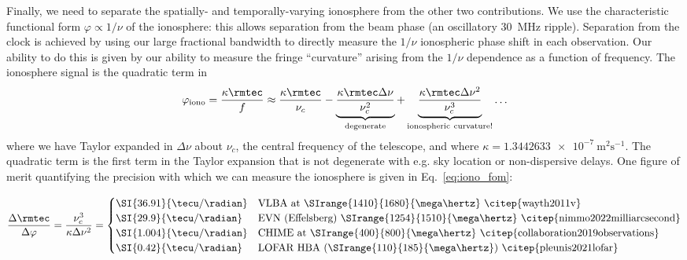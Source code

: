 Finally, we need to separate the spatially- and temporally-varying ionosphere from the other two contributions. We use the characteristic functional form $\varphi \propto 1/\nu$ of the ionosphere: this allows separation from the beam phase (an oscillatory \SI{30}{\mega\hertz} ripple). Separation from the clock is achieved by using our large fractional bandwidth to directly measure the $1/\nu$ ionospheric phase shift in each observation. Our ability to do this is given by our ability to measure the fringe ``curvature'' arising from the $1/\nu$ dependence as a function of frequency. The ionosphere signal is the quadratic term in
\begin{equation} 
    \varphi_\mathrm{iono} = \dfrac{\kappa \rmtec}{f} \approx \dfrac{\kappa \rmtec}{\nu_c} - \underbrace{\dfrac{\kappa \rmtec\Delta \nu}{\nu_c^2}}_\mathrm{degenerate} + \underbrace{\dfrac{\kappa\rmtec\Delta \nu^2}{\nu_c^3}}_{\mathrm{ionospheric~curvature!}} \ldots
\end{equation} 
where we have Taylor expanded in $\Delta \nu$ about $\nu_c$, the central frequency of the telescope, and where $\kappa = \SI{1.3442633e-7}{\meter^2\second^{-1}}$. The quadratic term is the first term in the Taylor expansion that is not degenerate with e.g. sky location or non-dispersive delays. One figure of merit quantifying the precision with which we can measure the ionosphere is given in Eq.~\ref{eq:iono_fom}:
\begin{widetext}
\begin{equation} 
\dfrac{\Delta\rmtec}{\Delta\varphi} = \dfrac{\nu_c^3}{\kappa \Delta \nu^2} = \begin{cases}
\SI{36.91}{\tecu / \radian} & \text{VLBA at \SIrange{1410}{1680}{\mega\hertz}~\citep{wayth2011v}} \\
\SI{29.9}{\tecu / \radian} & \text{EVN (Effelsberg) \SIrange{1254}{1510}{\mega\hertz}~\citep{nimmo2022milliarcsecond}} \\ %
\SI{1.004}{\tecu / \radian} & \text{CHIME at \SIrange{400}{800}{\mega\hertz}~\citep{collaboration2019observations}} \\ %
\SI{0.42}{\tecu / \radian} & \text{LOFAR HBA (\SIrange{110}{185}{\mega\hertz})~\citep{pleunis2021lofar}} %
\end{cases}
    \label{eq:iono_fom}
\end{equation}
\end{widetext}

